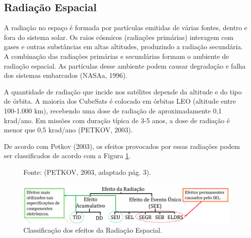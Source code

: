 \subsection{Radiação Espacial}

A radiação no espaço é formada por partículas emitidas de várias fontes, dentro e fora do sistema solar. Os raios cósmicos (radiações primárias) interagem com gases e outras substâncias em altas altitudes, produzindo a radiação secundária. A combinação das radiações primárias e secundárias formam o ambiente de radiação espacial. As partículas desse ambiente podem causar degradação e falha dos sistemas embarcados (NASAa, 1996).

A quantidade de radiação que incide nos satélites depende da altitude e do tipo de órbita. A maioria dos CubeSats é colocado em órbitas LEO (altitude entre 100-1.000 km), recebendo uma dose de radiação de aproximadamente 0,1 krad/ano. Em missões com duração típica de 3-5 anos, a dose de radiação é menor que 0,5 krad/ano  (PETKOV, 2003).

De acordo com Petkov (2003), os efeitos provocados por essas radiações podem ser classificados de acordo com a Figura \ref{fig17}.

\begin{figure}[h]
\footnotesize{
	\centering
	\footnotesize{Fonte: (PETKOV, 2003, adaptado pág. 3).}
	
	\centering
	\includegraphics[keepaspectratio=true,scale=0.58]{figuras/radiation_.png}
	\caption{Classificação dos efeitos da Radiação Espacial.}
	\label{fig17}
}
\end{figure}
\FloatBarrier


